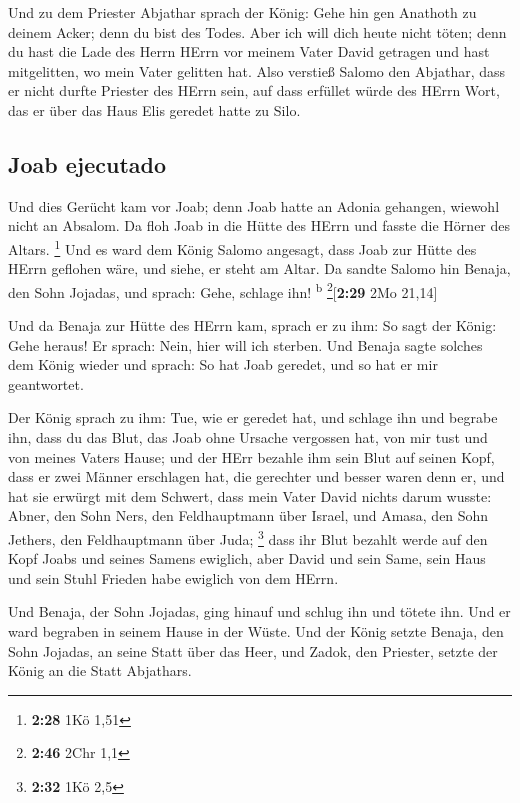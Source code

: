  Und zu dem Priester Abjathar sprach der König: Gehe hin
gen Anathoth zu deinem Acker; denn du bist des Todes. Aber ich will dich
heute nicht töten; denn du hast die Lade des Herrn HErrn vor meinem
Vater David getragen und hast mitgelitten, wo mein Vater gelitten hat.
 Also verstieß Salomo den Abjathar, dass er nicht durfte
Priester des HErrn sein, auf dass erfüllet würde des HErrn Wort, das er
über das Haus Elis geredet hatte zu Silo.

\hypertarget{joab-ejecutado}{%
\subsection{Joab ejecutado}\label{joab-ejecutado}}

 Und dies Gerücht kam vor Joab; denn Joab hatte an Adonia
gehangen, wiewohl nicht an Absalom. Da floh Joab in die Hütte des HErrn
und fasste die Hörner des Altars. \footnote{\textbf{2:28} 1Kö 1,51}
 Und es ward dem König Salomo angesagt, dass Joab zur
Hütte des HErrn geflohen wäre, und siehe, er steht am Altar. Da sandte
Salomo hin Benaja, den Sohn Jojadas, und sprach: Gehe, schlage ihn!
\textsuperscript{b} \footnote{\textbf{2:46} 2Chr 1,1}{[}\textbf{2:29}
2Mo 21,14{]}

 Und da Benaja zur Hütte des HErrn kam, sprach er zu ihm:
So sagt der König: Gehe heraus! Er sprach: Nein, hier will ich sterben.
Und Benaja sagte solches dem König wieder und sprach: So hat Joab
geredet, und so hat er mir geantwortet.

 Der König sprach zu ihm: Tue, wie er geredet hat, und
schlage ihn und begrabe ihn, dass du das Blut, das Joab ohne Ursache
vergossen hat, von mir tust und von meines Vaters Hause; 
und der HErr bezahle ihm sein Blut auf seinen Kopf, dass er zwei Männer
erschlagen hat, die gerechter und besser waren denn er, und hat sie
erwürgt mit dem Schwert, dass mein Vater David nichts darum wusste:
Abner, den Sohn Ners, den Feldhauptmann über Israel, und Amasa, den Sohn
Jethers, den Feldhauptmann über Juda; \footnote{\textbf{2:32} 1Kö 2,5}
 dass ihr Blut bezahlt werde auf den Kopf Joabs und
seines Samens ewiglich, aber David und sein Same, sein Haus und sein
Stuhl Frieden habe ewiglich von dem HErrn.

 Und Benaja, der Sohn Jojadas, ging hinauf und schlug ihn
und tötete ihn. Und er ward begraben in seinem Hause in der Wüste.
 Und der König setzte Benaja, den Sohn Jojadas, an seine
Statt über das Heer, und Zadok, den Priester, setzte der König an die
Statt Abjathars.

